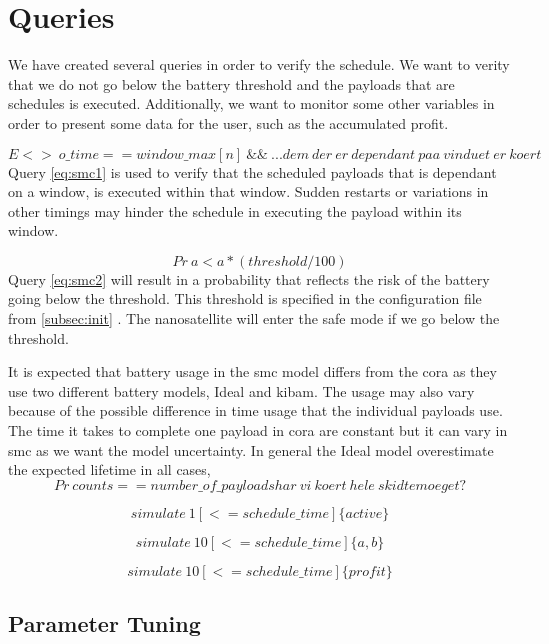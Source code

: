 \section{Queries}\label{sec:queries}
We have created several queries in order to verify the schedule. We want to verity that we do not go below the battery threshold and the payloads that are schedules is executed. Additionally, we want to monitor some other variables in order to present some data for the user, such as the accumulated profit.

\begin{equation} \label{eq:smc1}
	E<>\ o\_time == window\_max[n]\ \&\&\ ... dem\ der\ er\ dependant\ paa\ vinduet\ er\ koert
\end{equation}
Query \ref{eq:smc1} is used to verify that the scheduled payloads that is dependant on a window, is executed within that window. Sudden restarts or variations in other timings may hinder the schedule in executing the payload within its window. 

\begin{equation} \label{eq:smc2}
	Pr\ a < a*(threshold/100)
\end{equation}
Query \ref{eq:smc2} will result in a probability that reflects the risk of the battery going below the threshold. This threshold is specified in the configuration file from \cref{subsec:init} . The nanosatellite will enter the safe mode if we go below the threshold.

It is expected that battery usage in the \gls{smc} model differs from the \gls{cora} as they use two  different battery models, Ideal and \gls{kibam}. The usage may also vary because of the possible difference in time usage that the individual payloads use. The time it takes to complete one payload in \gls{cora} are constant but it can vary in \gls{smc} as we want the model uncertainty.
In general the Ideal model overestimate the expected lifetime in all cases,
\begin{equation} \label{eq:smc3}
	Pr\ counts == number\_of\_payloads har\ vi\ koert\ hele\ skidtemoeget?
\end{equation}

\begin{equation} \label{eq:smc4}
	simulate\ 1 [<=schedule\_time] \{ active\}
\end{equation}

\begin{equation} \label{eq:smc5}
	simulate\ 10 [<=schedule\_time] \{ a, b\}
\end{equation}

\begin{equation} \label{eq:smc6}
	simulate\ 10 [<= schedule\_time] \{ profit \}
\end{equation}




\subsection{Parameter Tuning}